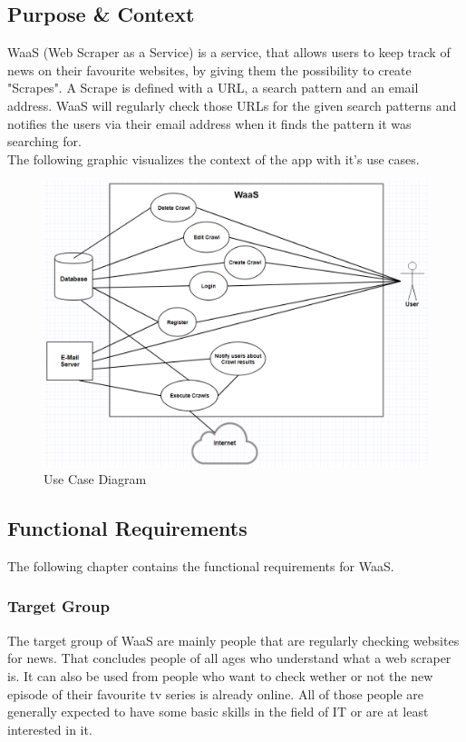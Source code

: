 \documentclass[titlepage, 12pt]{article}
\begin{document}
\subsection{Purpose \& Context}

WaaS (Web Scraper as a Service) is a service, that allows users to keep track of news on their favourite websites, by giving them the possibility to create "Scrapes". A Scrape is defined with a URL, a search pattern and an email address. WaaS will regularly check those URLs for the given search patterns and notifies the users via their email address when it finds the pattern it was searching for.
\medskip \\
The following graphic visualizes the context of the app with it's use cases.
\begin{figure}[H]
  \includegraphics[width=0.95\linewidth]{UseCaseDiagram.PNG}
  \caption{Use Case Diagram}
  \label{fig:useCaseDiagram}
\end{figure}

\subsection{Functional Requirements}

The following chapter contains the functional requirements for WaaS.

\subsubsection{Target Group}

The target group of WaaS are mainly people that are regularly checking websites for news. That concludes people of all ages who understand what a web scraper is. It can also be used from people who want to check wether or not the new episode of their favourite tv series is already online. All of those people are generally expected to have some basic skills in the field of IT or are at least interested in it.
\end{document}
